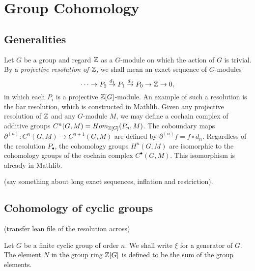 %


\chapter{Group Cohomology}

\section{Generalities}

Let $G$ be a group and regard $\mathbb Z$ as a $G$-module on which the action of $G$ is trivial.
By a \emph{projective resolution of $\mathbb Z$}, we shall mean an exact sequence of $G$-modules
\[
  \cdots \to P_2 \stackrel{d_1}\to P_1 \stackrel{d_0}\to P_0 \to \mathbb Z \to 0,
\]
in which each $P_i$ is a projective $\mathbb Z[G]$-module. An example of such
a resolution is the bar resolution, which is constructed in Mathlib.
Given any projective resolution of $\mathbb Z$ and any $G$-module $M$, we may define a cochain
complex of additive groups $C^n(G,M) = Hom_{\mathbb Z[G]}(P_n,M)$. The coboundary maps
$\partial^{(n)} : C^n(G,M) \to C^{n+1}(G,M)$ are defined by $\partial^{(n)} f = f \circ d_n$.
Regardless of the resolution $P_\bullet$,
the cohomology groups $H^n(G,M)$ are isomorphic to the cohomology groups
of the cochain complex $C^\bullet(G,M)$. This isomorphism is already in Mathlib.

(say something about long exact sequences, inflation and restriction).





\section{Cohomology of cyclic groups}

(transfer lean file of the resolution across)

Let $G$ be a finite cyclic group of order $n$. We shall write $\xi$ for a generator of $G$.
The element $N$ in the group ring $\mathbb Z[G]$ is defined to be the sum of the group elements.

